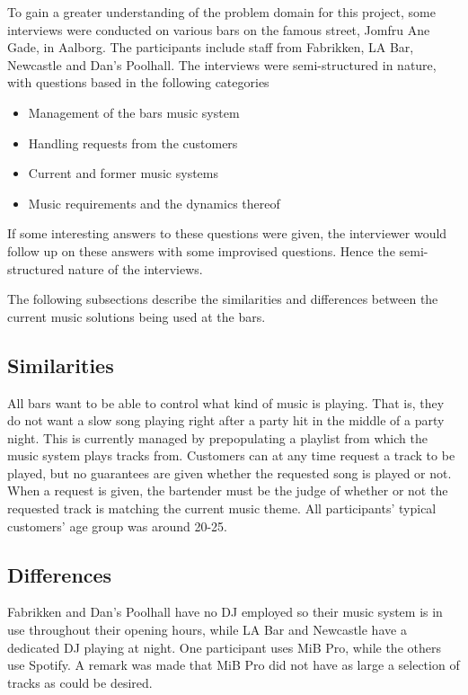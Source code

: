 \label{interviews}
To gain a greater understanding of the problem domain for this project, some interviews were conducted on various bars on the famous street, Jomfru Ane Gade, in Aalborg. The participants include staff from Fabrikken, LA Bar, Newcastle and Dan's Poolhall. The interviews were semi-structured in nature, with questions based in the following categories

\begin{itemize}
  \item Management of the bars music system
  \item Handling requests from the customers
  \item Current and former music systems
  \item Music requirements and the dynamics thereof
\end{itemize}

If some interesting answers to these questions were given, the interviewer would follow up on these answers with some improvised questions. Hence the semi-structured nature of the interviews.

The following subsections describe the similarities and differences between the current music solutions being used at the bars.

\subsection{Similarities}
\label{sub:similarities}
All bars want to be able to control what kind of music is playing. That is, they do not want a slow song playing right after a party hit in the middle of a party night. This is currently managed by prepopulating a playlist from which the music system plays tracks from. Customers can at any time request a track to be played, but no guarantees are given whether the requested song is played or not. When a request is given, the bartender must be the judge of whether or not the requested track is matching the current music theme. All participants' typical customers' age group was around 20-25.


\subsection{Differences}
\label{sub:differences}
Fabrikken and Dan's Poolhall have no DJ employed so their music system is in use throughout their opening hours, while LA Bar and Newcastle have a dedicated DJ playing at night. One participant uses MiB Pro, while the others use Spotify. A remark was made that MiB Pro did not have as large a selection of tracks as could be desired.

